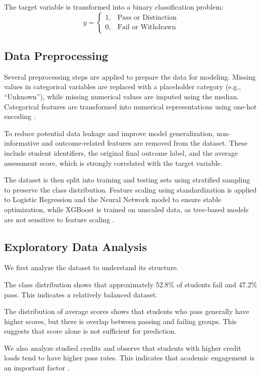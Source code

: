 \documentclass[conference]{IEEEtran}
\begin{document}
The target variable is transformed into a binary classification problem:
\[
y =
\begin{cases}
1, & \text{Pass or Distinction}\\
0, & \text{Fail or Withdrawn}
\end{cases}
\]

\subsection{Data Preprocessing}

Several preprocessing steps are applied to prepare the data for modeling. Missing values in categorical variables are replaced with a placeholder category (e.g., “Unknown”), while missing numerical values are imputed using the median. Categorical features are transformed into numerical representations using one-hot encoding \cite{nayak2023}.

To reduce potential data leakage and improve model generalization, non-informative and outcome-related features are removed from the dataset. These include student identifiers, the original final outcome label, and the average assessment score, which is strongly correlated with the target variable.

The dataset is then split into training and testing sets using stratified sampling to preserve the class distribution. Feature scaling using standardization is applied to Logistic Regression and the Neural Network model to ensure stable optimization, while XGBoost is trained on unscaled data, as tree-based models are not sensitive to feature scaling \cite{sitompul2025}.

\subsection{Exploratory Data Analysis}

We first analyze the dataset to understand its structure.

The class distribution shows that approximately 52.8\% of students fail and 47.2\% pass. This indicates a relatively balanced dataset.

The distribution of average scores shows that students who pass generally have higher scores, but there is overlap between passing and failing groups. This suggests that score alone is not sufficient for prediction.

We also analyze studied credits and observe that students with higher credit loads tend to have higher pass rates. This indicates that academic engagement is an important factor \cite{nayak2023}.
\end{document}
